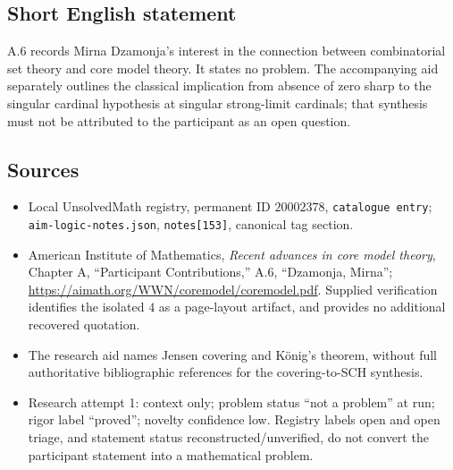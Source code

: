 \documentclass[11pt]{article}
\begin{document}
\subsection{Short English statement}
A.6 records Mirna Dzamonja's interest in the connection between combinatorial set theory and core model theory. It states no problem. The accompanying aid separately outlines the classical implication from absence of zero sharp to the singular cardinal hypothesis at singular strong-limit cardinals; that synthesis must not be attributed to the participant as an open question.
\subsection{Sources}
\begin{itemize}
\item Local UnsolvedMath registry, permanent ID $20002378$, \texttt{catalogue entry}; \texttt{aim-logic-notes.json}, \texttt{notes[153]}, canonical tag section.
\item American Institute of Mathematics, \emph{Recent advances in core model theory}, Chapter A, ``Participant Contributions,'' A.6, ``Dzamonja, Mirna''; \url{https://aimath.org/WWN/coremodel/coremodel.pdf}. Supplied verification identifies the isolated $4$ as a page-layout artifact, and provides no additional recovered quotation.
\item The research aid names Jensen covering and K\"onig's theorem, without full authoritative bibliographic references for the covering-to-SCH synthesis.
\item Research attempt 1: context only; problem status ``not a problem'' at run; rigor label ``proved''; novelty confidence low. Registry labels open and open triage, and statement status reconstructed/unverified, do not convert the participant statement into a mathematical problem.
\end{itemize}
\end{document}
